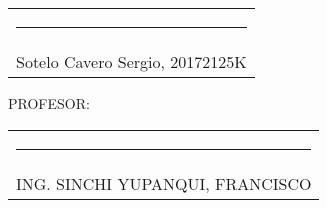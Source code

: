 \documentclass[a4paper,12pt]{report}
\begin{document}
\begin{center}
\begin{tabular}{c}
\rule[1pt]{3.14in}{1pt}\\
Sotelo Cavero Sergio, 20172125K\\[2.5cm]
\end{tabular}
\end{center}

{\large PROFESOR:} \\[2cm]
\begin{center}
\begin{tabular}{c}
\rule[3pt]{4.8in}{1pt}\\[1pt]
ING. SINCHI YUPANQUI, FRANCISCO 
\end{tabular}
\end{center}
\vfill
\newpage
\tableofcontents
\newpage
{} %
\setcounter{page}{1}  %
\end{document}
